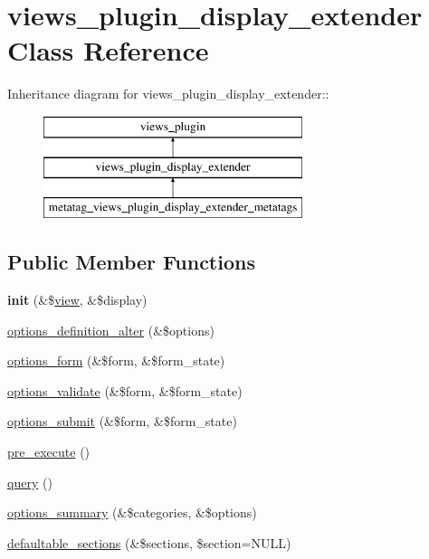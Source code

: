 \hypertarget{classviews__plugin__display__extender}{
\section{views\_\-plugin\_\-display\_\-extender Class Reference}
\label{classviews__plugin__display__extender}
}
Inheritance diagram for views\_\-plugin\_\-display\_\-extender::\begin{figure}[H]
\begin{center}
\leavevmode
\includegraphics[height=3cm]{classviews__plugin__display__extender}
\end{center}
\end{figure}
\subsection*{Public Member Functions}
\begin{DoxyCompactItemize}
\item 
\hypertarget{classviews__plugin__display__extender_a8e2f1616c7d07d4afe693cd8dd9061f6}{
{\bfseries init} (\&\$\hyperlink{classview}{view}, \&\$display)}
\label{classviews__plugin__display__extender_a8e2f1616c7d07d4afe693cd8dd9061f6}

\item 
\hyperlink{classviews__plugin__display__extender_a684077b715aa9ddce09d223544b7263c}{options\_\-definition\_\-alter} (\&\$options)
\item 
\hyperlink{classviews__plugin__display__extender_abbc782f6c6cdaa21db41379a7fbbb61c}{options\_\-form} (\&\$form, \&\$form\_\-state)
\item 
\hyperlink{classviews__plugin__display__extender_a0a0fe3d8d71d295e99a72c371160515c}{options\_\-validate} (\&\$form, \&\$form\_\-state)
\item 
\hyperlink{classviews__plugin__display__extender_a30f3b8a5bd28012f09b9e5dbb4a2a083}{options\_\-submit} (\&\$form, \&\$form\_\-state)
\item 
\hyperlink{classviews__plugin__display__extender_a0de1a2dce78f95867b56801d2659e35b}{pre\_\-execute} ()
\item 
\hyperlink{classviews__plugin__display__extender_ac8eef76f1f05ac916f9549d5d94164b8}{query} ()
\item 
\hyperlink{classviews__plugin__display__extender_a7f95727e4d29fc9450bfcb38df8d7fa9}{options\_\-summary} (\&\$categories, \&\$options)
\item 
\hyperlink{classviews__plugin__display__extender_ae7dfa23cf88eee9abdbdf6e6ba622f61}{defaultable\_\-sections} (\&\$sections, \$section=NULL)
\end{DoxyCompactItemize}


